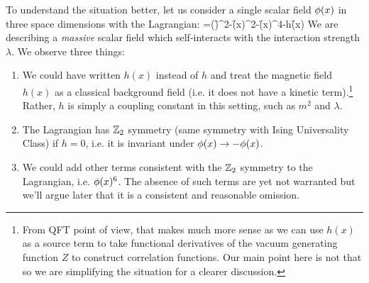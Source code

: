 To understand the situation better, let us consider a single scalar field $\phi(x)$ in three space dimensions with the Lagrangian:
\be 
\label{eq: 3d scalar field}
\cL=\half(\partial\f)^2-\f(x)^2-\f(x)^4-h\f(x)
\ee 
We are describing a \emph{massive} scalar field which self-interacts with the interaction strength $\lambda$. We observe three things:
\begin{enumerate}
	\item We could have written $h(x)$ instead of $h$ and treat the magnetic field $h(x)$ as a classical background field (i.e. it does not have a kinetic term).\footnote{From QFT point of view, that makes much more sense as we can use $h(x)$ as a source term to take functional derivatives of the vacuum generating function $Z$ to construct correlation functions. Our main point here is not that so we are simplifying the situation for a clearer discussion.} Rather, $h$ is simply a coupling constant in this setting, such as $m^2$ and $\lambda$.
	\item The Lagrangian has $\mathbb{Z}_2$ symmetry (same symmetry with Ising Universality Class) if $h=0$, i.e. it is invariant under $\phi(x)\rightarrow-\phi(x)$.
	\item We could add other terms consistent with the $\mathbb{Z}_2$ symmetry to the Lagrangian, i.e. $\phi(x)^6$. The absence of such terms are yet not warranted but we'll argue later that it is a consistent and reasonable omission.
\end{enumerate}
